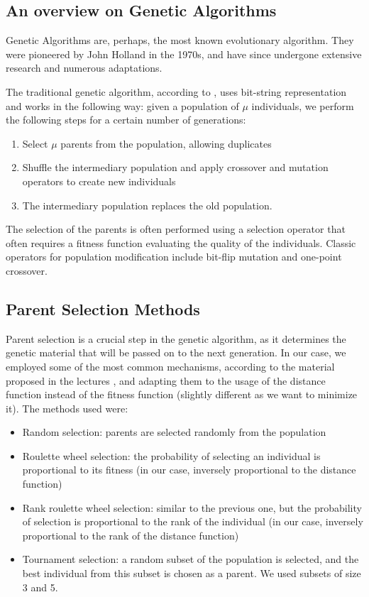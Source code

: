 \documentclass[11pt]{article}
\begin{document}
\subsection{An overview on Genetic Algorithms}
Genetic Algorithms are, perhaps, the most known evolutionary algorithm. They were pioneered by John Holland in the 1970s, and have since undergone extensive research and numerous adaptations. 

The traditional genetic algorithm, according to \cite{Eiben2003}, uses bit-string representation and works in the following way:
given a population of $\mu$ individuals, we perform the following steps for a certain number of generations:
\begin{enumerate}
    \item Select $\mu$ parents from the population, allowing duplicates
    \item Shuffle the intermediary population and apply crossover and mutation operators to create new individuals
    \item The intermediary population replaces the old population.
\end{enumerate}

The selection of the parents is often performed using a selection operator that often requires a fitness function evaluating the quality of the individuals. Classic operators for population modification include bit-flip mutation and one-point crossover.

\subsection{Parent Selection Methods}
Parent selection is a crucial step in the genetic algorithm, as it determines the genetic material that will be passed on to the next generation. In our case, we employed some of the most common mechanisms, according to the material proposed in the lectures \cite{Belanche2024}, and adapting them to the usage of the distance function instead of the fitness function (slightly different as we want to minimize it). The methods used were:
\begin{itemize}
    \item Random selection: parents are selected randomly from the population
    \item Roulette wheel selection: the probability of selecting an individual is proportional to its fitness (in our case, inversely proportional to the distance function)
    \item Rank roulette wheel selection: similar to the previous one, but the probability of selection is proportional to the rank of the individual (in our case, inversely proportional to the rank of the distance function)
    \item Tournament selection: a random subset of the population is selected, and the best individual from this subset is chosen as a parent. We used subsets of size 3 and 5.
\end{itemize}
\end{document}
